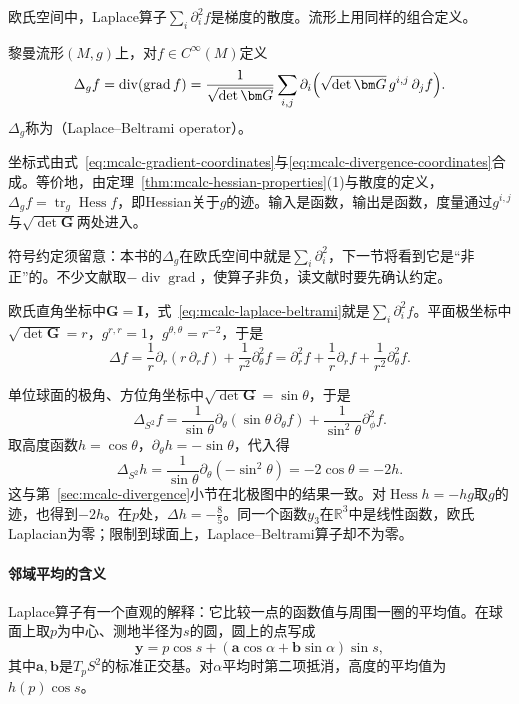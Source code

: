 欧氏空间中，Laplace算子$\sum_i\partial_i^2f$是梯度的散度。流形上用同样的组合定义。

\begin{definition}
\label{def:mcalc-laplace-beltrami}
黎曼流形$(M,g)$上，对$f\in C^\infty(M)$定义
\begin{equation}
\Delta_gf=\operatorname{div}(\operatorname{grad}f)=\frac1{\sqrt{\det\bm G}}\sum_{i,j}\partial_i\Bigl(\sqrt{\det\bm G}\,g^{i,j}\,\partial_jf\Bigr).
\label{eq:mcalc-laplace-beltrami}
\end{equation}
$\Delta_g$称为（Laplace--Beltrami operator）。
\end{definition}

坐标式由式~\eqref{eq:mcalc-gradient-coordinates}与\eqref{eq:mcalc-divergence-coordinates}合成。等价地，由定理~\ref{thm:mcalc-hessian-properties}(1)与散度的定义，$\Delta_gf=\operatorname{tr}_g\operatorname{Hess}f$，即Hessian关于$g$的迹。输入是函数，输出是函数，度量通过$g^{i,j}$与$\sqrt{\det\bm G}$两处进入。

符号约定须留意：本书的$\Delta_g$在欧氏空间中就是$\sum_i\partial_i^2$，下一节将看到它是“非正”的。不少文献取$-\operatorname{div}\operatorname{grad}$，使算子非负，读文献时要先确认约定。

\begin{example}
\label{ex:mcalc-laplacian-examples}
欧氏直角坐标中$\bm G=\bm I$，式~\eqref{eq:mcalc-laplace-beltrami}就是$\sum_i\partial_i^2f$。平面极坐标中$\sqrt{\det\bm G}=r$，$g^{r,r}=1$，$g^{\theta,\theta}=r^{-2}$，于是
\[
\Delta f=\frac1r\partial_r(r\,\partial_rf)+\frac1{r^2}\partial_\theta^2f=\partial_r^2f+\frac1r\partial_rf+\frac1{r^2}\partial_\theta^2f .
\]

单位球面的极角、方位角坐标中$\sqrt{\det\bm G}=\sin\theta$，于是
\[
\Delta_{S^2}f=\frac1{\sin\theta}\partial_\theta(\sin\theta\,\partial_\theta f)+\frac1{\sin^2\theta}\partial_\phi^2f .
\]
取高度函数$h=\cos\theta$，$\partial_\theta h=-\sin\theta$，代入得
\[
\Delta_{S^2}h=\frac1{\sin\theta}\partial_\theta(-\sin^2\theta)=-2\cos\theta=-2h .
\]
这与第~\ref{sec:mcalc-divergence}小节在北极图中的结果一致。对$\operatorname{Hess}h=-hg$取$g$的迹，也得到$-2h$。在$p$处，$\Delta h=-\tfrac85$。同一个函数$y_3$在$\mathbb R^3$中是线性函数，欧氏Laplacian为零；限制到球面上，Laplace--Beltrami算子却不为零。
\end{example}

\paragraph{邻域平均的含义}
Laplace算子有一个直观的解释：它比较一点的函数值与周围一圈的平均值。在球面上取$p$为中心、测地半径为$s$的圆，圆上的点写成
\[
\bm y=p\cos s+(\bm a\cos\alpha+\bm b\sin\alpha)\sin s ,
\]
其中$\bm a,\bm b$是$T_pS^2$的标准正交基。对$\alpha$平均时第二项抵消，高度的平均值为$h(p)\cos s$。

